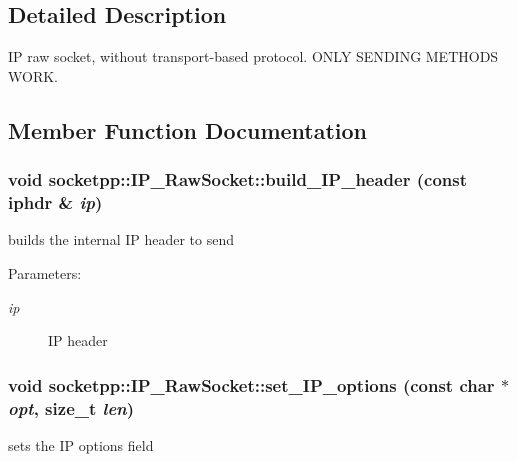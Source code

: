 \subsection{Detailed Description}
IP raw socket, without transport-based protocol. ONLY SENDING METHODS WORK. 

\subsection{Member Function Documentation}
\hypertarget{classsocketpp_1_1IP__RawSocket_f93c51a7a8284fe9d2b24019b13a5803}{
\subsubsection{\setlength{\rightskip}{0pt plus 5cm}void socketpp::IP\_\-RawSocket::build\_\-IP\_\-header (const iphdr \& {\em ip})}}
\label{classsocketpp_1_1IP__RawSocket_f93c51a7a8284fe9d2b24019b13a5803}


builds the internal IP header to send 

\begin{Desc}
\item[Parameters:]
\begin{description}
\item[{\em ip}]IP header \end{description}
\end{Desc}
\hypertarget{classsocketpp_1_1IP__RawSocket_82c0b2c75d081bc84d8e60bf18199e65}{
\subsubsection{\setlength{\rightskip}{0pt plus 5cm}void socketpp::IP\_\-RawSocket::set\_\-IP\_\-options (const char $\ast$ {\em opt}, \/  size\_\-t {\em len})}}
\label{classsocketpp_1_1IP__RawSocket_82c0b2c75d081bc84d8e60bf18199e65}


sets the IP options field 

